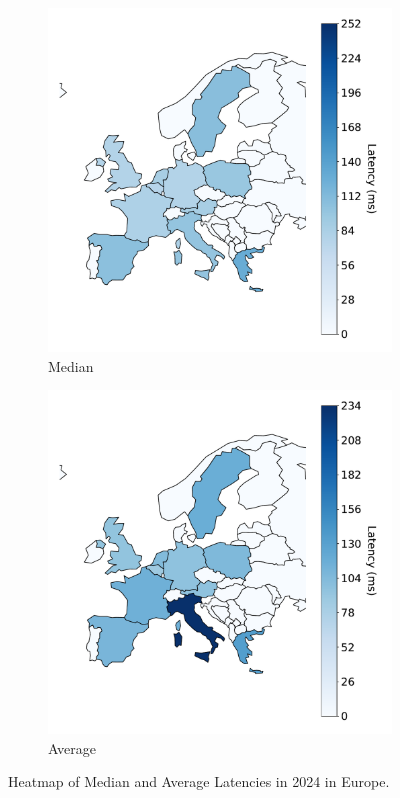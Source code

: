 \begin{figure}[h]
	\centering
	\begin{subfigure}[t]{0.47\linewidth}
		\includegraphics[width=\linewidth]{chapters/4-results/latency/img/heatmap-median-latencies-2024.pdf}
		\caption{Median}
	\end{subfigure}
	\begin{subfigure}[t]{0.47\linewidth}
		\includegraphics[width=\linewidth]{chapters/4-results/latency/img/heatmap-average-latencies-2024.pdf}
		\caption{Average}
	\end{subfigure}
	\caption{Heatmap of Median and Average Latencies in 2024 in Europe.}
	\label{fig:heatmap-latencies-europe}
\end{figure}

